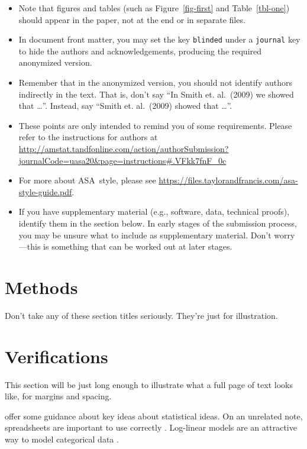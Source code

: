 \documentclass[
  12pt]{article}
\providecommand{\tightlist}{%
  \setlength{\itemsep}{0pt}\setlength{\parskip}{0pt}}\usepackage{longtable,booktabs,array}
\begin{document}
\begin{itemize}
\tightlist
\item
  Note that figures and tables (such as Figure~\ref{fig-first} and
  Table~\ref{tbl-one}) should appear in the paper, not at the end or in
  separate files.
\item
  In document front matter, you may set the key \texttt{blinded} under a
  \texttt{journal} key to hide the authors and acknowledgements,
  producing the required anonymized version.
\item
  Remember that in the anonymized version, you should not identify
  authors indirectly in the text. That is, don't say ``In Smith et.
  al.~(2009) we showed that \ldots{}''. Instead, say ``Smith et.
  al.~(2009) showed that \ldots{}''.
\item
  These points are only intended to remind you of some requirements.
  Please refer to the instructions for authors at
  \url{http://amstat.tandfonline.com/action/authorSubmission?journalCode=uasa20\&page=instructions\#.VFkk7fnF_0c}
\item
  For more about ASA~style, please see
  \url{https://files.taylorandfrancis.com/asa-style-guide.pdf}.
\item
  If you have supplementary material (e.g., software, data, technical
  proofs), identify them in the section below. In early stages of the
  submission process, you may be unsure what to include as supplementary
  material. Don't worry---this is something that can be worked out at
  later stages.
\end{itemize}

\hypertarget{sec-meth}{%
\section{Methods}\label{sec-meth}}

Don't take any of these section titles seriously. They're just for
illustration.

\hypertarget{sec-verify}{%
\section{Verifications}\label{sec-verify}}

This section will be just long enough to illustrate what a full page of
text looks like, for margins and spacing.

\addtolength{\textheight}{.5in}%

\citet{gelm:veht:2021} offer some guidance about key ideas about
statistical ideas. On an unrelated note, spreadsheets are important to
use correctly \citep{brom:woo:2018}. Log-linear models are an attractive
way to model categorical data \citep{bish:fien:1975}.
\end{document}
